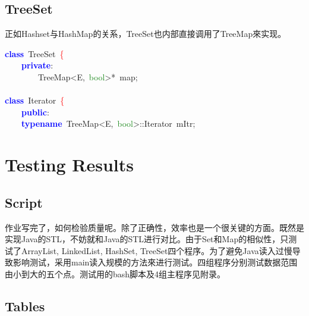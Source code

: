 \subsection{TreeSet}
正如Hashset与HashMap的关系，TreeSet也内部直接调用了TreeMap來实现。

\begin{center}\begin{minipage}{120mm}
\noindent
\mbox{}\textbf{\textcolor{Blue}{class}}\ \textcolor{TealBlue}{TreeSet}\ \textcolor{Red}{\{} \\
\mbox{}\ \ \ \ \textbf{\textcolor{Blue}{private}}\textcolor{BrickRed}{:} \\
\mbox{}\ \ \ \ \ \ \ \ TreeMap\textcolor{BrickRed}{\textless{}}E\textcolor{BrickRed}{,}\ \textcolor{ForestGreen}{bool}\textcolor{BrickRed}{\textgreater{}*}\ map\textcolor{BrickRed}{;} \\
\mbox{} \\
\mbox{}\textbf{\textcolor{Blue}{class}}\ \textcolor{TealBlue}{Iterator}\ \textcolor{Red}{\{} \\
\mbox{}\ \ \ \ \textbf{\textcolor{Blue}{public}}\textcolor{BrickRed}{:} \\
\mbox{}\ \ \ \ \textbf{\textcolor{Blue}{typename}}\ \textcolor{TealBlue}{TreeMap}\textcolor{BrickRed}{\textless{}}E\textcolor{BrickRed}{,}\ \textcolor{ForestGreen}{bool}\textcolor{BrickRed}{\textgreater{}::}\textcolor{TealBlue}{Iterator}\ mItr\textcolor{BrickRed}{;}
\end{minipage}\end{center}

\section{Testing Results}

\subsection{Script}
作业写完了，如何检验质量呢。除了正确性，效率也是一个很关键的方面。既然是实现Java的STL，不妨就和Java的STL进行对比。由于Set和Map的相似性，只测试了ArrayList, LinkedList, HashSet, TreeSet四个程序。为了避免Java读入过慢导致影响测试，采用main读入规模的方法來进行测试。四组程序分别测试数据范围由小到大的五个点。测试用的bash脚本及4组主程序见附录。

\subsection{Tables}


